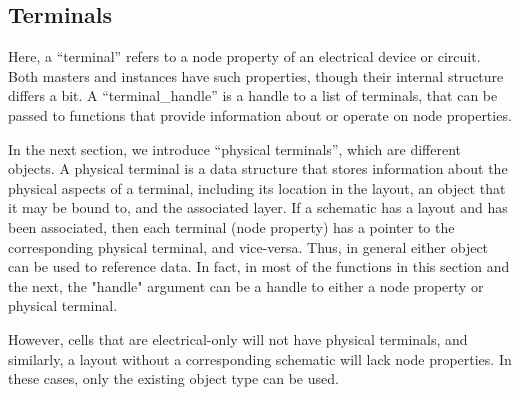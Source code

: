 \subsection{Terminals}

Here, a ``terminal'' refers to a {\et node} property of an electrical
device or circuit.  Both masters and instances have such properties,
though their internal structure differs a bit.  A ``terminal\_handle''
is a handle to a list of terminals, that can be passed to functions
that provide information about or operate on node properties.

In the next section, we introduce ``physical terminals'', which are
different objects.  A physical terminal is a data structure that
stores information about the physical aspects of a terminal, including
its location in the layout, an object that it may be bound to, and the
associated layer.  If a schematic has a layout and has been
associated, then each terminal (node property) has a pointer to the
corresponding physical terminal, and vice-versa.  Thus, in general
either object can be used to reference data.  In fact, in most of the
functions in this section and the next, the "handle" argument can be a
handle to either a node property or physical terminal.

However, cells that are electrical-only will not have physical
terminals, and similarly, a layout without a corresponding schematic
will lack node properties.  In these cases, only the existing object
type can be used.

